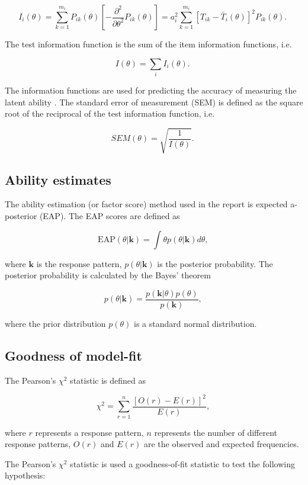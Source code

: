 \documentclass[a4paper]{report}
\begin{document}
$$I_i(\theta) = \sum_{k=1}^{m_i} P_{ik}(\theta) [-\frac{\partial^2}{\partial \theta^2} P_{ik}(\theta)] = a_i^2 \sum_{k=1}^{m_i} [T_{ik} - \bar{T}_i(\theta)]^2 P_{ik}(\theta) \text{. }$$

The test information function is the sum of the item information functions, i.e. 

$$I(\theta) = \sum_i I_i(\theta) \text{. }$$

The information functions are used for predicting the accuracy of measuring the latent ability \cite{VisualIRT}. The standard error of measurement (SEM) is defined as the square root of the reciprocal of the test information function, i.e. 

$$SEM(\theta) = \sqrt{\frac{1}{I(\theta)}} \text{. }$$

\subsection{Ability estimates}

The ability estimation (or factor score) method used in the report is expected a-posterior (EAP). The EAP scores are defined as

$$\mathrm{EAP}(\theta | \boldsymbol k) = \int \theta p(\theta|\boldsymbol k) d\theta \text{, }$$

\noindent
where $\boldsymbol k$ is the response pattern, $p(\theta|\boldsymbol k)$ is the posterior probability. The posterior probability is calculated by the Bayes' theorem

$$p(\theta|\boldsymbol k) = \frac{p(\boldsymbol k|\theta) p(\theta)}{p(\boldsymbol k)} \text{, }$$

\noindent
where the prior distribution $p(\theta)$ is a standard normal distribution. 

\subsection{Goodness of model-fit}

The Pearson's $\chi^2$ statistic is defined as 

$$\chi^2 = \sum_{r=1}^{n} \frac{[O(r) - E(r)]^2}{E(r)} \text{, }$$

\noindent
where $r$ represents a response pattern, $n$ represents the number of different response patterns, $O(r)$ and $E(r)$ are the observed and expected frequencies. 

The Pearson's $\chi^2$ statistic is used a goodness-of-fit statistic to test the following hypothesis: 
\end{document}

